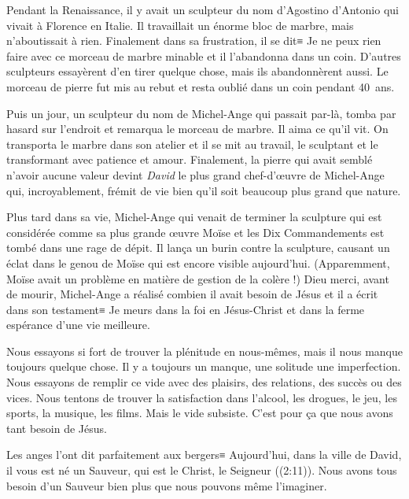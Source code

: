 

Pendant la Renaissance, il y avait un sculpteur du nom d'Agostino d'Antonio qui vivait à Florence en Italie. Il travaillait un énorme bloc de marbre, mais n'aboutissait à rien. Finalement dans sa frustration, il se dit≡ \og Je ne peux rien faire avec ce morceau de marbre minable \fg{} et il l'abandonna dans un coin. D'autres sculpteurs essayèrent d'en tirer quelque chose, mais ils abandonnèrent aussi. Le morceau de pierre fut mis au rebut et resta oublié dans un coin pendant 40~ans.

Puis un jour, un sculpteur du nom de Michel-Ange qui passait par-là, tomba par hasard sur l'endroit et remarqua le morceau de marbre. Il aima ce qu'il vit. On transporta le marbre dans son atelier et il se mit au travail, le sculptant et le transformant avec patience et amour. Finalement, la pierre qui avait semblé n'avoir aucune valeur devint \emph{David} le plus grand chef-d'œuvre de Michel-Ange qui, incroyablement, frémit de vie bien qu'il soit beaucoup plus grand que nature.

Plus tard dans sa vie, Michel-Ange qui venait de terminer la sculpture qui est considérée comme sa plus grande œuvre \ocadr Moïse et les Dix Commandements \fcadr{} est tombé dans une rage de dépit. Il lança un burin contre la sculpture, causant un éclat dans le genou de Moïse qui est encore visible aujourd'hui. (Apparemment, Moïse avait un problème en matière de \og gestion de la colère \fg{}!) Dieu merci, avant de mourir, Michel-Ange a réalisé combien il avait besoin de Jésus et il a écrit dans son testament≡ \og Je meurs dans la foi en Jésus-Christ et dans la ferme espérance d'une vie meilleure. \fg{}

Nous essayons si fort de trouver la plénitude en nous-mêmes, mais il nous manque toujours quelque chose. Il y a toujours un manque, une solitude une imperfection. Nous essayons de remplir ce vide avec des plaisirs, des relations, des succès ou des vices. Nous tentons de trouver la satisfaction dans l'alcool, les drogues, le jeu, les sports, la musique, les films. Mais le vide subsiste. C'est pour ça que nous avons tant besoin de Jésus.

Les anges l'ont dit parfaitement aux bergers≡  \og Aujourd'hui, dans la ville de David, il vous est né un Sauveur, qui est le Christ, le Seigneur\fg{} ((2:11)). Nous avons tous besoin d'un Sauveur bien plus que nous pouvons même l'imaginer.


